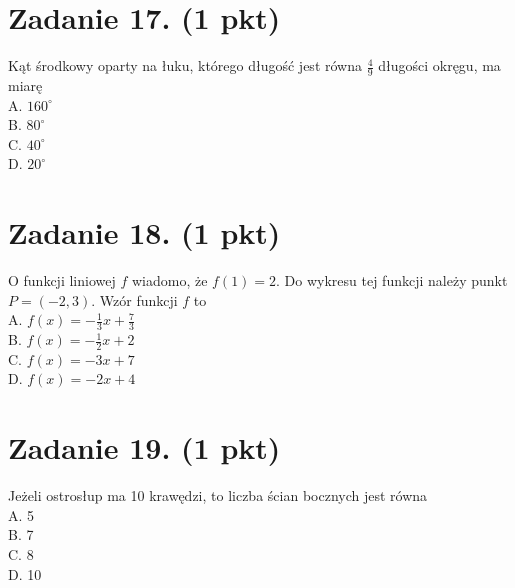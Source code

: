 \documentclass[10pt]{article}
\begin{document}
\section*{Zadanie 17. (1 pkt)}
Kąt środkowy oparty na łuku, którego długość jest równa \(\frac{4}{9}\) długości okręgu, ma miarę\\
A. \(160^{\circ}\)\\
B. \(80^{\circ}\)\\
C. \(40^{\circ}\)\\
D. \(20^{\circ}\)

\section*{Zadanie 18. (1 pkt)}
O funkcji liniowej \(f\) wiadomo, że \(f(1)=2\). Do wykresu tej funkcji należy punkt \(P=(-2,3)\). Wzór funkcji \(f\) to\\
A. \(f(x)=-\frac{1}{3} x+\frac{7}{3}\)\\
B. \(f(x)=-\frac{1}{2} x+2\)\\
C. \(f(x)=-3 x+7\)\\
D. \(f(x)=-2 x+4\)

\section*{Zadanie 19. (1 pkt)}
Jeżeli ostrosłup ma 10 krawędzi, to liczba ścian bocznych jest równa\\
A. 5\\
B. 7\\
C. 8\\
D. 10
\end{document}

